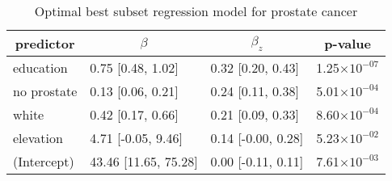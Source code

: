 \begin{table}[!tbp]
\caption{Optimal best subset regression model for prostate cancer\label{SI_tab:prostate}} 
\begin{center}
\begin{tabular}{llll}
\hline\hline
\multicolumn{1}{c}{predictor}&\multicolumn{1}{c}{$\beta$}&\multicolumn{1}{c}{$\beta_z$}&\multicolumn{1}{c}{p-value}\tabularnewline
\hline
education&0.75 [0.48, 1.02]&0.32 [0.20, 0.43]&1.25$\times10^{-07}$\tabularnewline
no prostate&0.13 [0.06, 0.21]&0.24 [0.11, 0.38]&5.01$\times10^{-04}$\tabularnewline
white&0.42 [0.17, 0.66]&0.21 [0.09, 0.33]&8.60$\times10^{-04}$\tabularnewline
elevation&4.71 [-0.05, 9.46]&0.14 [-0.00, 0.28]&5.23$\times10^{-02}$\tabularnewline
(Intercept)&43.46 [11.65, 75.28]&0.00 [-0.11, 0.11]&7.61$\times10^{-03}$\tabularnewline
\hline
\end{tabular}\end{center}

\end{table}
